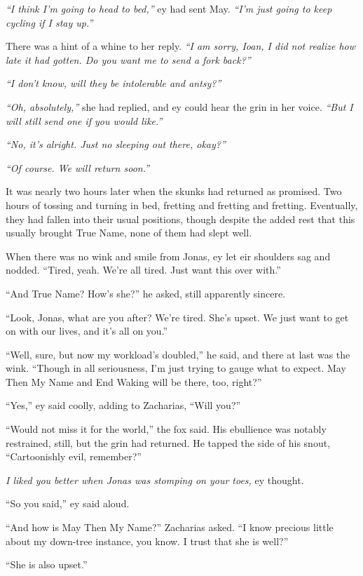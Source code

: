 \emph{``I think I'm going to head to bed,''} ey had sent May. \emph{``I'm just going to keep cycling if I stay up.''}

There was a hint of a whine to her reply. \emph{``I am sorry, Ioan, I did not realize how late it had gotten. Do you want me to send a fork back?''}

\emph{``I don't know, will they be intolerable and antsy?''}

\emph{``Oh, absolutely,''} she had replied, and ey could hear the grin in her voice. \emph{``But I will still send one if you would like.''}

\emph{``No, it's alright. Just no sleeping out there, okay?''}

\emph{``Of course. We will return soon.''}

It was nearly two hours later when the skunks had returned as promised. Two hours of tossing and turning in bed, fretting and fretting and fretting. Eventually, they had fallen into their usual positions, though despite the added rest that this usually brought True Name, none of them had slept well.

When there was no wink and smile from Jonas, ey let eir shoulders sag and nodded. ``Tired, yeah. We're all tired. Just want this over with.''

``And True Name? How's she?'' he asked, still apparently sincere.

``Look, Jonas, what are you after? We're tired. She's upset. We just want to get on with our lives, and it's all on you.''

``Well, sure, but now my workload's doubled,'' he said, and there at last was the wink. ``Though in all seriousness, I'm just trying to gauge what to expect. May Then My Name and End Waking will be there, too, right?''

``Yes,'' ey said coolly, adding to Zacharias, ``Will you?''

``Would not miss it for the world,'' the fox said. His ebullience was notably restrained, still, but the grin had returned. He tapped the side of his snout, ``Cartoonishly evil, remember?''

\emph{I liked you better when Jonas was stomping on your toes,} ey thought.

``So you said,'' ey said aloud.

``And how is May Then My Name?'' Zacharias asked. ``I know precious little about my down-tree instance, you know. I trust that she is well?''

``She is also upset.''

